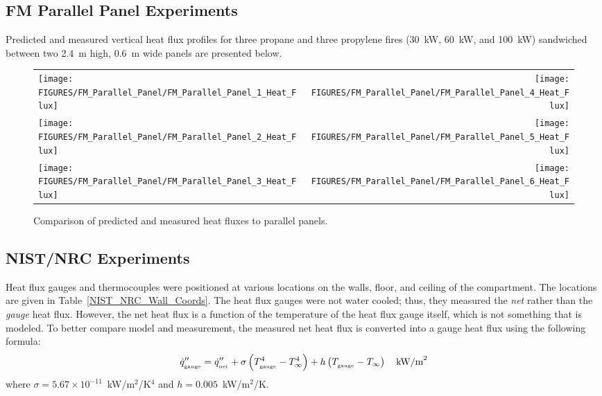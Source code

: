 \clearpage


\subsection{FM Parallel Panel Experiments}

Predicted and measured vertical heat flux profiles for three propane and three propylene fires (30~kW, 60~kW, and 100~kW) sandwiched between two 2.4~m high, 0.6~m wide panels are presented below.

\begin{figure}[h!]
\begin{tabular*}{\textwidth}{l@{\extracolsep{\fill}}r}
\texttt{[image: FIGURES/FM\_Parallel\_Panel/FM\_Parallel\_Panel\_1\_Heat\_Flux]} &
\texttt{[image: FIGURES/FM\_Parallel\_Panel/FM\_Parallel\_Panel\_4\_Heat\_Flux]} \\
\texttt{[image: FIGURES/FM\_Parallel\_Panel/FM\_Parallel\_Panel\_2\_Heat\_Flux]} &
\texttt{[image: FIGURES/FM\_Parallel\_Panel/FM\_Parallel\_Panel\_5\_Heat\_Flux]} \\
\texttt{[image: FIGURES/FM\_Parallel\_Panel/FM\_Parallel\_Panel\_3\_Heat\_Flux]} &
\texttt{[image: FIGURES/FM\_Parallel\_Panel/FM\_Parallel\_Panel\_6\_Heat\_Flux]}
\end{tabular*}
\label{FM_Parallel_Panel}
\caption[Side wall heat flux predictions, FM Parallel Panel experiments]
{Comparison of predicted and measured heat fluxes to parallel panels.}
\end{figure}


\clearpage

\subsection{NIST/NRC Experiments}

Heat flux gauges and thermocouples were positioned at various locations on the walls, floor, and ceiling of the compartment. The locations are given in Table~\ref{NIST_NRC_Wall_Coords}. The heat flux gauges were not water cooled; thus, they measured the {\em net} rather than the {\em gauge} heat flux. However, the net heat flux is a function of the temperature of the heat flux gauge itself, which is not something that is modeled. To better compare model and measurement, the measured net heat flux is converted into a gauge heat flux using the following formula:
\begin{equation}
\dot{q}''_{_{\textrm{\tiny gauge}}} = \dot{q}''_{_{\textrm{\tiny net}}} + \sigma \left( T^4_{_{\textrm{\tiny gauge}}} - T^4_\infty \right) + h  \left( T_{_{\textrm{\tiny gauge}}}-T_\infty \right) \quad \hbox{kW/m}^2
\end{equation}
where $\sigma=5.67 \times 10^{-11}$~kW/m$^2$/K$^4$ and $h=0.005$~kW/m$^2$/K.

